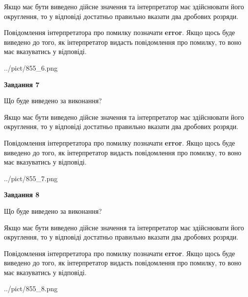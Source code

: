 \documentclass[12pt, ukrainian]{article}
\begin{document}
{\begin {Large}
Якщо має бути виведено дійсне значення та інтерпретатор має здійснювати його округлення, 
то у відповіді достатньо правильно вказати два дробових розряди.

Повідомлення інтерпретатора про помилку позначати \textbf{error}.
Якщо щось буде виведено до того, як інтерпретатор видасть повідомлення про помилку, 
то воно має вказуватись у відповіді. \par

\begin{center}
	{../pict/855_6.png}
\end{center}
\newpage

{\begin {center}\textbf{Завдання 7}\end {center}}\par
Що буде виведено за виконання? \par

Якщо має бути виведено дійсне значення та інтерпретатор має здійснювати його округлення, 
то у відповіді достатньо правильно вказати два дробових розряди.

Повідомлення інтерпретатора про помилку позначати \textbf{error}.
Якщо щось буде виведено до того, як інтерпретатор видасть повідомлення про помилку, 
то воно має вказуватись у відповіді. \par

\begin{center}
	{../pict/855_7.png}
\end{center}
\newpage

{\begin {center}\textbf{Завдання 8}\end {center}}\par
Що буде виведено за виконання? \par

Якщо має бути виведено дійсне значення та інтерпретатор має здійснювати його округлення, 
то у відповіді достатньо правильно вказати два дробових розряди.

Повідомлення інтерпретатора про помилку позначати \textbf{error}.
Якщо щось буде виведено до того, як інтерпретатор видасть повідомлення про помилку, 
то воно має вказуватись у відповіді. \par

\begin{center}
	{../pict/855_8.png}
\end{center}
\newpage


\end{Large}}
\end{document}
